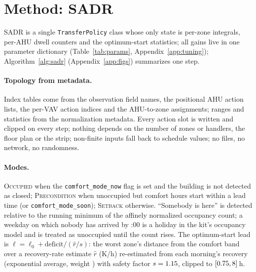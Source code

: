 \documentclass{article}
\begin{document}
\section{Method: SADR}
\label{sec:method}

SADR is a single \texttt{TransferPolicy} class whose only state is per-zone integrals,
per-AHU dwell counters and the optimum-start statistics; all gains live in one parameter
dictionary (Table~\ref{tab:params}, Appendix~\ref{app:tuning}); Algorithm~\ref{alg:sadr} (Appendix~\ref{app:figs}) summarizes one step.

\paragraph{Topology from metadata.}
Index tables come from the observation field names, the positional AHU action lists, the
per-VAV action indices and the AHU-to-zone assignments; ranges and statistics from the
normalization metadata. Every action slot is written and clipped on every step; nothing depends
on the number of zones or handlers, the floor plan or the strip; non-finite inputs fall back to
schedule values; no files, no network, no randomness.

\paragraph{Modes.}
\textsc{Occupied} when the \texttt{comfort\_mode\_now} flag is set and the building is not
detected as closed; \textsc{Precondition} when unoccupied but comfort hours start within a
lead time (or \texttt{comfort\_mode\_soon}); \textsc{Setback} otherwise. ``Somebody is here''
is detected relative to the running minimum of the affinely normalized occupancy count; a
weekday on which nobody has arrived by \ParHolidayCheckH{}:00 is a holiday in the kit's
occupancy model and is treated as unoccupied until the count rises. The optimum-start lead is $\ell = \ell_0 +
\text{deficit}/(\hat{r}/s)$: the worst zone's distance from the comfort band over a
recovery-rate estimate $\hat{r}$ (K/h) re-estimated from each morning's recovery
(exponential average, weight \ParRateEma) with safety factor $s=1.15$, clipped to
$[0.75, 8]$\,h.
\end{document}
